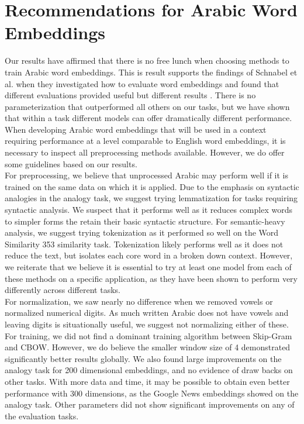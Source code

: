 \chapter{Recommendations for Arabic Word Embeddings}
\label{sec:recommendations}

Our results have affirmed that there is no free lunch when choosing methods to train Arabic word embeddings. This is result supports the findings of Schnabel et al. when they investigated how to evaluate word embeddings and found that different evaluations provided useful but different results \cite{schnabel2015evaluation}. There is no parameterization that outperformed all others on our tasks, but we have shown that within a task different models can offer dramatically different performance. When developing Arabic word embeddings that will be used in a context requiring performance at a level comparable to English word embeddings, it is necessary to inspect all preprocessing methods available. However, we do offer some guidelines based on our results.
\\
For preprocessing, we believe that unprocessed Arabic may perform well if it is trained on the same data on which it is applied. Due to the emphasis on syntactic analogies in the analogy task, we suggest trying lemmatization for tasks requiring syntactic analysis. We suspect that it performs well as it reduces complex words to simpler forms the retain their basic syntactic structure. For semantic-heavy analysis, we suggest trying tokenization as it performed so well on the Word Similarity 353 similarity task. Tokenization likely performs well as it does not reduce the text, but isolates each core word in a broken down context. However, we reiterate that we believe it is essential to try at least one model from each of these methods on a specific application, as they have been shown to perform very differently across different tasks.
\\
For normalization, we saw nearly no difference when we removed vowels or normalized numerical digits. As much written Arabic does not have vowels and leaving digits is situationally useful, we suggest not normalizing either of these. For training, we did not find a dominant training algorithm between Skip-Gram and CBOW. However, we do believe the smaller window size of 4 demonstrated significantly better results globally. We also found large improvements on the analogy task for 200 dimensional embeddings, and no evidence of draw backs on other tasks. With more data and time, it may be possible to obtain even better performance with 300 dimensions, as the Google News embeddings showed on the analogy task. Other parameters did not show significant improvements on any of the evaluation tasks.